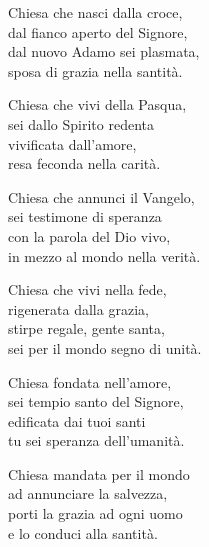 
\strofa Chiesa che nasci dalla croce,\\
dal fianco aperto del Signore,\\
dal nuovo Adamo sei plasmata,\\
sposa di grazia nella santità.

\spazio

Chiesa che vivi della Pasqua,\\
sei dallo Spirito redenta\\
vivificata dall'amore,\\
resa feconda nella carità.

\spazio


\spazio

\strofa Chiesa che annunci il Vangelo,\\
sei testimone di speranza\\
con la parola del Dio vivo,\\
in mezzo al mondo nella verità.

\spazio

Chiesa che vivi nella fede,\\
rigenerata dalla grazia,\\
stirpe regale, gente santa,\\
sei per il mondo segno di unità.

\spazio


\spazio

\strofa Chiesa fondata nell'amore,\\
sei tempio santo del Signore,\\
edificata dai tuoi santi\\
tu sei speranza dell'umanità.

\spazio

Chiesa mandata per il mondo\\
ad annunciare la salvezza,\\
porti la grazia ad ogni uomo\\
e lo conduci alla santità.

\spazio


